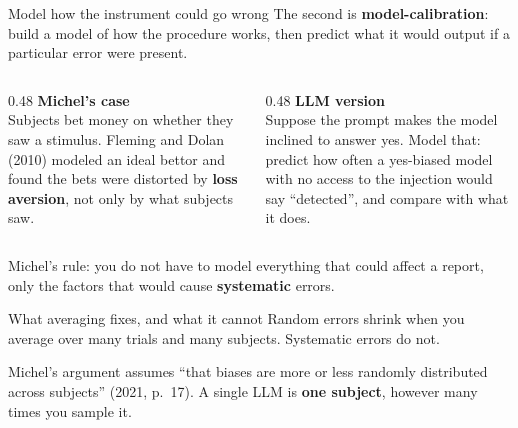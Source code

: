 \documentclass[aspectratio=169,11pt]{beamer}
\begin{document}
\begin{frame}[label=modelcal]{Model how the instrument could go wrong}
The second is \textbf{model-calibration}: build a model of how the procedure works, then predict what it would output if a particular error were present.

\vspace{0.5em}
\begin{columns}[T]
\begin{column}{0.48\textwidth}
{\small\textbf{Michel's case}}\\[0.2em]
{\footnotesize Subjects bet money on whether they saw a stimulus. Fleming and Dolan (2010) modeled an ideal bettor and found the bets were distorted by \textbf{loss aversion}, not only by what subjects saw.}
\end{column}
\begin{column}{0.48\textwidth}
{\small\textbf{LLM version}}\\[0.2em]
{\footnotesize Suppose the prompt makes the model inclined to answer yes. Model that: predict how often a yes-biased model with no access to the injection would say ``detected'', and compare with what it does.}
\end{column}
\end{columns}

\vspace{0.8em}
{\small Michel's rule: you do not have to model everything that could affect a report, only the factors that would cause \textbf{systematic} errors.}
\end{frame}

\begin{frame}[label=averaging]{What averaging fixes, and what it cannot}
Random errors shrink when you average over many trials and many subjects. Systematic errors do not.

\vspace{0.6em}
\begin{center}
\end{center}

\vspace{0.5em}
Michel's argument assumes ``that biases are more or less randomly distributed across subjects'' (2021, p.~17).
A single LLM is \textbf{one subject}, however many times you sample it.
\end{frame}
\end{document}
